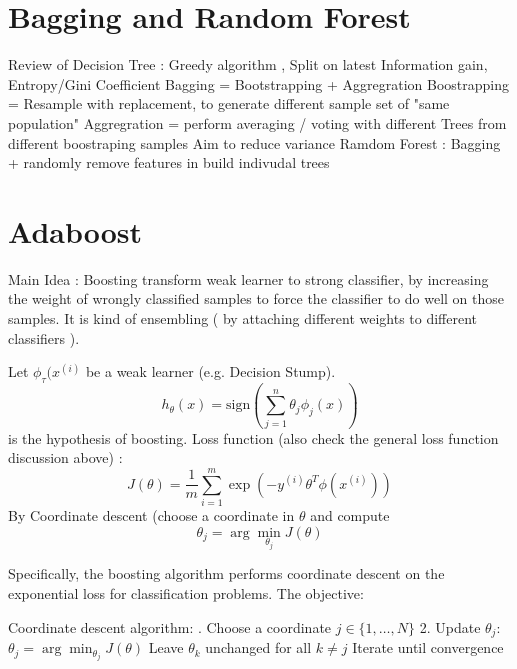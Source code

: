 \documentclass{article}
\begin{document}
\section{Bagging and Random Forest}
Review of Decision Tree : Greedy algorithm , Split on latest Information gain, Entropy/Gini Coefficient \newline
Bagging =  Bootstrapping + Aggregration \newline
Boostrapping = Resample with replacement, to generate different sample set of "same population"  \newline
Aggregration = perform averaging / voting with different Trees from different boostraping samples \newline
Aim to reduce variance \newline
Ramdom Forest : Bagging + randomly remove features in build indivudal trees \newline

\section{Adaboost}

Main Idea : Boosting transform weak learner to strong classifier, by increasing the weight of wrongly classified samples to force the classifier to do well on those samples.  It is kind of ensembling ( by attaching different weights to different classifiers ). 



Let \(\phi_{\tau} (x^{(i)} \) be a  weak learner (e.g. Decision Stump).
\[
h_\theta(x) = \text{sign} \left( \sum_{j=1}^n \theta_j \phi_j(x) \right)
\] 
is the hypothesis of boosting.\newline
Loss function (also check the general loss function discussion above) : \newline
\[
J(\theta) = \frac{1}{m} \sum_{i=1}^{m} \exp(-y^{(i)} \theta^T \phi(x^{(i)}))
\]
By Coordinate descent (choose a coordinate in \(\theta\)  and compute  
\[
\theta_j = \arg \min_{\theta_j} J(\theta)
\]


Specifically, the boosting algorithm performs coordinate descent on the exponential loss for classification problems. The objective:

Coordinate descent algorithm: . Choose a coordinate \( j \in \{1, \ldots, N\} \)
2. Update \( \theta_j \): \( \theta_j = \arg \min_{\theta_j} J(\theta) \)
   Leave \( \theta_k \) unchanged for all \( k \neq j \)
   Iterate until convergence
\end{document}
